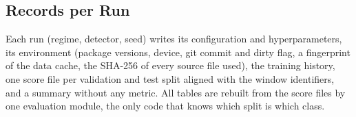 \subsection{Records per Run}\label{sec:records}

Each run (regime, detector, seed) writes its configuration and hyperparameters, its environment (package
versions, device, git commit and dirty flag, a fingerprint of the data cache, the SHA-256 of every source file
used), the training history, one score file per validation and test split aligned with the window identifiers,
and a summary without any metric. All tables are rebuilt from the score files by one evaluation module, the only
code that knows which split is which class.

